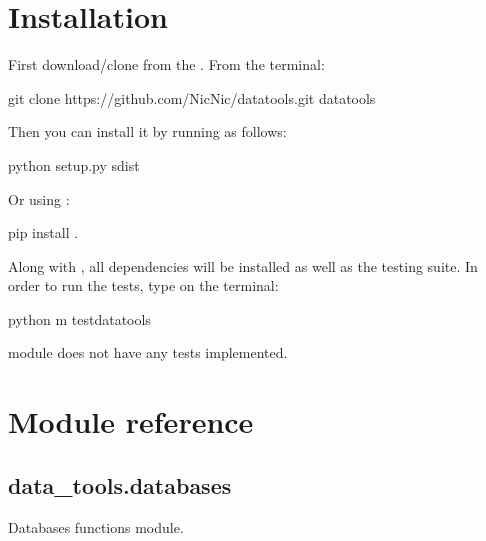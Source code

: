\documentclass[letterpaper,10pt,english]{sphinxmanual}
\begin{document}
\chapter{Installation}
\label{\detokenize{index:installation}}
First download/clone  from the
.
From the terminal:

%
\begin{sphinxVerbatim}[commandchars=\\\{\}]
git clone https://github.com/Nic\PYGZhy{}Nic/data\PYGZus{}tools.git
 data\PYGZus{}tools
\end{sphinxVerbatim}

Then you can install it by running  as follows:

%
\begin{sphinxVerbatim}[commandchars=\\\{\}]
python setup.py sdist
\end{sphinxVerbatim}

Or using :

%
\begin{sphinxVerbatim}[commandchars=\\\{\}]
pip install .
\end{sphinxVerbatim}

Along with , all dependencies will be installed as well as
the testing suite. In order to run the tests, type on the terminal:

%
\begin{sphinxVerbatim}[commandchars=\\\{\}]
python \PYGZhy{}m test\PYGZus{}data\PYGZus{}tools
\end{sphinxVerbatim}

  module does not have any tests
implemented.


\chapter{Module reference}
\label{\detokenize{index:module-reference}}\label{\detokenize{databases:module-data_tools.databases}}

\section{data\_tools.databases}
\label{\detokenize{databases:data-tools-databases}}\label{\detokenize{databases::doc}}
Databases functions module.
\end{document}
